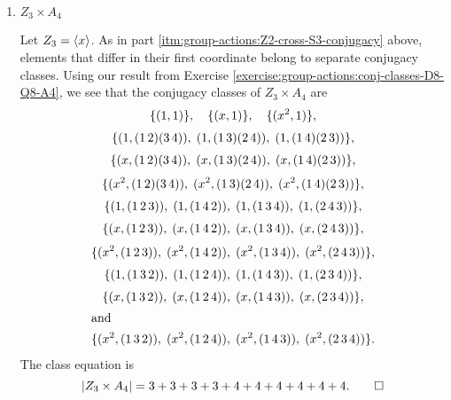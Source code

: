\begin{enumerate}
\item $Z_3\times A_4$
  \begin{solution}
    Let $Z_3 = \langle{x}\rangle$. As in part
    \ref{itm:group-actions:Z2-cross-S3-conjugacy} above, elements that
    differ in their first coordinate belong to separate conjugacy
    classes. Using our result from Exercise
    \ref{exercise:group-actions:conj-classes-D8-Q8-A4}, we see that
    the conjugacy classes of $Z_3\times A_4$ are
    \begin{gather*}
      \{(1,1)\}, \quad \{(x,1)\}, \quad \{(x^2,1)\}, \\[3pt]
      \{(1, (1\,2)(3\,4)),\; (1, (1\,3)(2\,4)),\; (1, (1\,4)(2\,3))\}, \\[3pt]
      \{(x, (1\,2)(3\,4)),\; (x, (1\,3)(2\,4)),\; (x, (1\,4)(2\,3))\}, \\[3pt]
      \{(x^2, (1\,2)(3\,4)),\; (x^2, (1\,3)(2\,4)),\; (x^2, (1\,4)(2\,3))\}, \\[3pt]
      \{(1, (1\,2\,3)),\; (1, (1\,4\,2)),\; (1, (1\,3\,4)),\; (1, (2\,4\,3))\}, \\[3pt]
      \{(x, (1\,2\,3)),\; (x, (1\,4\,2)),\; (x, (1\,3\,4)),\; (x, (2\,4\,3))\}, \\[3pt]
      \{(x^2, (1\,2\,3)),\; (x^2, (1\,4\,2)),\; (x^2, (1\,3\,4)),\; (x^2, (2\,4\,3))\}, \\[3pt]
      \{(1, (1\,3\,2)),\; (1, (1\,2\,4)),\; (1, (1\,4\,3)),\; (1, (2\,3\,4))\}, \\[3pt]
      \{(x, (1\,3\,2)),\; (x, (1\,2\,4)),\; (x, (1\,4\,3)),\; (x, (2\,3\,4))\}, \\
      \intertext{and}
      \{(x^2, (1\,3\,2)),\; (x^2, (1\,2\,4)),\; (x^2, (1\,4\,3)),\; (x^2, (2\,3\,4))\}.
    \end{gather*}
    The class equation is
    \begin{equation*}
      \lvert{Z_3\times A_4}\rvert = 3 + 3 + 3 + 3 + 4 + 4 + 4 + 4 + 4 + 4. \qedhere
    \end{equation*}
  \end{solution}
\end{enumerate}
